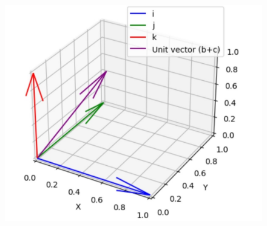 \documentclass[12pt]{article}
\begin{document}
\begin{enumerate}
\begin{figure}[!h]
\begin{center}
\includegraphics[width=\columnwidth]{figs/unitvector}
\caption{}
\end{center}				
\end{figure}
\end{enumerate}
\end{document}
